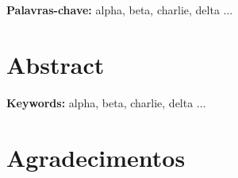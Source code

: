 \documentclass[a4paper,11pt]{article}
\newcommand\tab[1][0.8cm]{\hspace*{#1}}
\begin{document}
\blindtext      %
\vspace{8pt}

\blindtext      %
\vspace{40pt}

\noindent\textbf{Palavras-chave:} alpha, beta, charlie, delta ...


\pagebreak


\section{Abstract}

\tab \blindtext \par %
\vspace{8pt}

\blindtext      %
\vspace{8pt}

\blindtext      %
\vspace{40pt}

\noindent\textbf{Keywords:} alpha, beta, charlie, delta ...

\pagebreak


\section{Agradecimentos}

\begin{flushright}       %
    
\blindtext     

\vspace{8pt}

\blindtext

\end{flushright}

\pagebreak





\renewcommand{\contentsname}{Índice}        %
\tableofcontents
{}

\vspace{40pt}
\listoffigures

\vspace{40pt}
\listoftables



\pagebreak




\setcounter{secnumdepth}{3}
\end{document}
